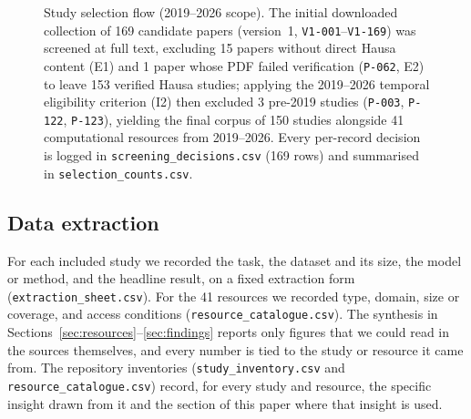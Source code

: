 \documentclass[sn-basic,pdflatex]{sn-jnl}
\begin{document}
\begin{figure}[!htb]
{%
}%
\caption{Study selection flow (2019--2026 scope). The initial downloaded collection of 169 candidate papers (version~1, \texttt{V1-001}--\texttt{V1-169}) was screened at full text, excluding 15 papers without direct Hausa content (E1) and 1 paper whose PDF failed verification (\texttt{P-062}, E2) to leave 153 verified Hausa studies; applying the 2019--2026 temporal eligibility criterion (I2) then excluded 3 pre-2019 studies (\texttt{P-003}, \texttt{P-122}, \texttt{P-123}), yielding the final corpus of 150 studies alongside 41 computational resources from 2019--2026. Every per-record decision is logged in \texttt{screening\_decisions.csv} (169 rows) and summarised in \texttt{selection\_counts.csv}.}
\label{fig:selection}
\end{figure}
\subsection{Data extraction}
For each included study we recorded the task, the dataset and its size, the model or method, and the headline result, on a fixed extraction form (\texttt{extraction\_sheet.csv}). For the 41 resources we recorded type, domain, size or coverage, and access conditions (\texttt{resource\_catalogue.csv}). The synthesis in Sections~\ref{sec:resources}--\ref{sec:findings} reports only figures that we could read in the sources themselves, and every number is tied to the study or resource it came from. The repository inventories (\texttt{study\_inventory.csv} and \texttt{resource\_catalogue.csv}) record, for every study and resource, the specific insight drawn from it and the section of this paper where that insight is used.
\end{document}
